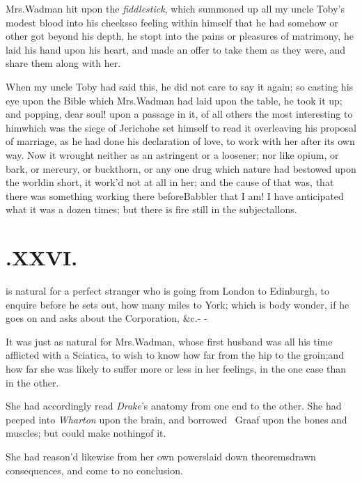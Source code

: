 \documentclass{article}
\begin{document}
Mrs.\@ Wadman hit upon the \textit{fiddlestick}, which
summoned up all my uncle Toby’s modest blood into his
cheeks\tsk so feeling within himself that he had somehow or other
got beyond his depth, he stopt\etp{}
into the pains or pleasures of matrimony, he laid his hand
upon his heart, and made an offer to take them as they were, and
share them along with her.

When my uncle Toby had said this, he did not care to say
it again; so casting his eye upon the Bible which 
Mrs.\@ Wadman had laid upon the table, he took it up; and popping,
dear soul! upon a passage in it, of all others the most interesting
to him\tsk which was the siege of Jericho\tsk he set
himself to read it over\tsk leaving his proposal of marriage, as he had done his declaration of love, to work with
her after its own way. Now it wrought neither as an astringent or a
loosener; nor like opium, or bark, or mercury, or buckthorn, or any
one\etp{} drug which nature had bestowed upon the world\tsk in short,
it work’d not at all in her; and the cause of that was, that
there was something working there before\tsh Babbler that
I am! I have anticipated what it was a dozen times; but there is
fire still in the subject\tsh\break allons.

\vfill{}\eject
\null{}\baselineskip
\section{.\enspace XXVI.}

 is natural for a perfect stranger
who is going from London to Edin\-burgh, to enquire
before he sets out, how many miles to York; which is\break
{} 
body wonder, if he goes on
and asks about the Corporation, \&c.\@ - -

It was just as natural for Mrs.\@ Wadman, whose first
husband was all his time afflicted with a Sciatica, to wish to know
how far from the hip to the groin;\break and how far she was likely to suffer more or less in
her feelings, in the one case than in the other.

She had accordingly read \textit{Drake}’s anatomy from one end
to the other. She\etp{} had peeped into \textit{Wharton}
upon the brain, and borrowed \fnast\ Graaf upon the bones and
muscles; but could make nothing\break of it.

She had reason’d likewise from her own
powers\tsh laid down theorems\break\tsh drawn
consequences, and come to no conclusion.
\end{document}
